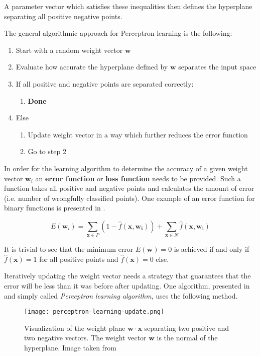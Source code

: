 A parameter vector which satisfies these inequalities then defines the hyperplane separating all positive negative points.

The general algorithmic approach for Perceptron learning is the following:
\begin{enumerate}
    \item Start with a random weight vector $\bm{w}$
    \item Evaluate how accurate the hyperplane defined by $\bm{w}$ separates the input space
    \item If all positive and negative points are separated correctly:
    \begin{enumerate}
        \item \textbf{Done}
    \end{enumerate}
    \item Else
    \begin{enumerate}
        \item Update weight vector in a way which further reduces the error function
        \item Go to step 2
    \end{enumerate}
\end{enumerate}

In order for the learning algorithm to determine the accuracy of a given weight vector $\bm{w}_i$ an \textbf{error function} or \textbf{loss function} needs to be provided.
Such a function takes all positive and negative points and calculates the amount of error (i.e. number of wrongfully classified points).
One example of an error function for binary functions is presented in \cite{rojas_neural_1996}.

\begin{equation}
    \label{eq:error-binary}
    E(\bm{w}_i) = \sum_{\bm{x} \in P} (1 - \hat{f}(\bm{x},\bm{w_i})) + \sum_{\bm{x} \in N} \hat{f}(\bm{x},\bm{w_i})
\end{equation}

It is trivial to see that the minimum error $E(\bm{w}) = 0$ is achieved if and only if $\hat{f}(\bm{x}) = 1$ for all positive points and $\hat{f}(\bm{x}) = 0$ else.

Iteratively updating the weight vector needs a strategy that guarantees that the error will be less than it was before after updating.
One algorithm, presented in \cite{rojas_neural_1996} and simply called \textit{Perceptron learning algorithm}, uses the following method.

\begin{figure}[htb!]
    \centering
    \texttt{[image: perceptron-learning-update.png]}
    \caption{Visualization of the weight plane $\bm{w} \cdot \bm{x}$ separating two positive and two negative vectors. The weight vector $\bm{w}$ is the normal of the hyperplane. Image taken from \cite{rojas_neural_1996}}
    \label{fig:perceptron-learning-update}
\end{figure}

